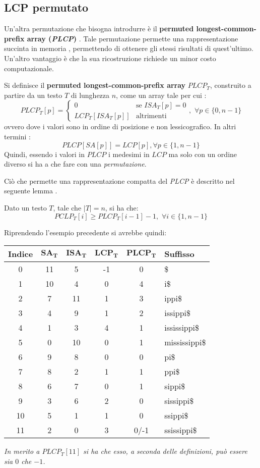 \subsection{LCP permutato}
Un'altra permutazione che bisogna introdurre è il \textbf{permuted
  longest-common-prefix array (\textit{PLCP})} \cite{plcp}. Tale permutazione
permette una rappresentazione succinta in memoria \cite{plcp2},
permettendo di ottenere gli stessi risultati di quest'ultimo. Un'altro vantaggio
è che la sua ricostruzione richiede un minor costo computazionale.
\begin{definizione}
  Si definisce il \textbf{permuted longest-common-prefix array} $PLCP_T$,
  construito a partire da un testo $T$ di lunghezza $n$, come un
  array tale per cui \cite{phoni}:
  \[PLCP_T[p]=
    \begin{cases}
      0&\mbox{se }ISA_T[p]=0\\
      LCP_T[ISA_T[p]]&\mbox{altrimenti}
    \end{cases},\,\,\forall p\in\{0,n-1\}
  \]
  ovvero dove i valori sono in ordine di posizione e non lessicografico. In
  altri termini \cite{plcp}:
  \[PLCP[SA[p]] = LCP[p],\forall p\in\{1,n-1\}\]
  Quindi, essendo i valori in $PLCP$ i medesimi in $LCP$ ma solo con un ordine
  diverso si ha a che fare con una \emph{permutazione}.
\end{definizione}
Ciò che permette una rappresentazione compatta del \textit{PLCP} è descritto nel
seguente lemma \cite{plcp3}.
\begin{lemma}
  Dato un testo $T$, tale che $|T|=n$, si ha che:
  \[PCLP_T[i]\geq PLCP_T[i-1]-1,\,\,\forall i\in\{1,n-1\}\]
\end{lemma}
\begin{esempio}
  Riprendendo l'esempio precedente si avrebbe quindi:
  \begin{table}[H]
    \centering
    \footnotesize
    \begin{tabular}{c|c|c|c|c|l} 
      \textbf{Indice} & $\mathbf{SA_T}$ & $\mathbf{ISA_T}$ & $\mathbf{LCP_T}$
      & $\mathbf{PLCP_T}$ & \textbf{Suffisso}\\  
      \hline
      0 & 11 & 5 & -1 & 0 & \$\\
      1 & 10 & 4 & 0 & 4 & i\$\\
      2 & 7 & 11 & 1 & 3 & ippi\$\\
      3 & 4 & 9 & 1 & 2 & issippi\$\\
      4 & 1 & 3 & 4 & 1 & ississippi\$\\
      5 & 0 & 10 & 0 & 1 & mississippi\$\\
      6 & 9 & 8 & 0 & 0 & pi\$\\
      7 & 8 & 2 & 1 & 1 & ppi\$\\
      8 & 6 & 7 & 0 & 1 & sippi\$\\
      9 & 3 & 6 & 2 & 0 & sissippi\$\\
      10 & 5 & 1 & 1 & 0 & ssippi\$\\
      11 & 2 & 0 & 3 & 0/-1 &  ssissippi\$\\
    \end{tabular}
  \end{table}
  \textit{In merito a $PLCP_T[11]$ si ha che esso, a seconda delle definizioni,
    può essere sia $0$ che $-1$.}
\end{esempio}
